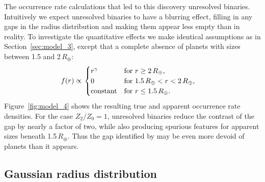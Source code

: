 \documentclass[12pt,modern,trackchanges]{aastex61}
\begin{document}
The occurrence rate calculations that led to this discovery  
unresolved binaries.
Intuitively we expect
unresolved binaries to have a blurring effect, filling in any gaps in
the  radius distribution and making them appear less empty than in
reality.  To investigate the quantitative effects we make identical
assumptions as in Section~\ref{sec:model_3}, except that  a complete absence of planets with
sizes between 1.5 and 2\,$R_\oplus$:
\begin{align}
    f(r)
    &\propto
    \left.
    \begin{cases}
        r^\gamma & \text{for } r\geq 2\,R_\oplus, \\
        0 & \text{for } 1.5\,R_\oplus < r < 2\,R_\oplus, \\
        {\rm constant} & \text{for } r\leq 1.5\,R_\oplus.
    \end{cases}
    \right.
    \label{eq:model4_radius_distribution}
\end{align}
Figure~\ref{fig:model_4} shows the resulting true and apparent
occurrence rate densities.  For the case $Z_2/Z_0=1$, unresolved
binaries reduce the contrast of the gap by nearly a factor of two,
while also producing spurious features for apparent sizes beneath
1.5\,$R_\oplus$.  Thus the gap identified by
\citet{fulton_california-_2017} may be even more devoid of planets
than it appears.


\subsection{Gaussian radius distribution}
\label{sec:hjs}
\end{document}
